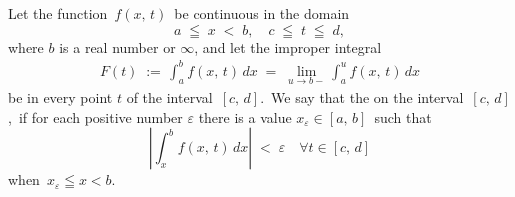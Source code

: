 \documentclass[12pt]{article}
\begin{document}
Let the function\, $f(x,\,t)$\, be continuous in the domain
 $$a \;\leqq\; x \;<\; b, \quad c \;\leqq\; t \;\leqq\; d,$$
where $b$ is a real number or $\infty$, and let the improper integral
\begin{align}
   F(t) \;:=\, \int_a^b f(x,\,t)\,dx \;=\; \lim_{u \to b-}\int_a^u f(x,\,t)\,dx
\end{align}
be  in every point $t$ of the interval\, $[c,\,d]$.\, We say that the  on the interval\, $[c,\,d]$,\, if for each positive number $\varepsilon$ there is a value $x_\varepsilon \in [a,\,b]$\, such that
$$\left|\int_x^b f(x,\,t)\,dx\right| \;<\; \varepsilon\quad\forall t\in [c,\,d]$$
when\, $x_\varepsilon \leqq x < b$.
\end{document}
